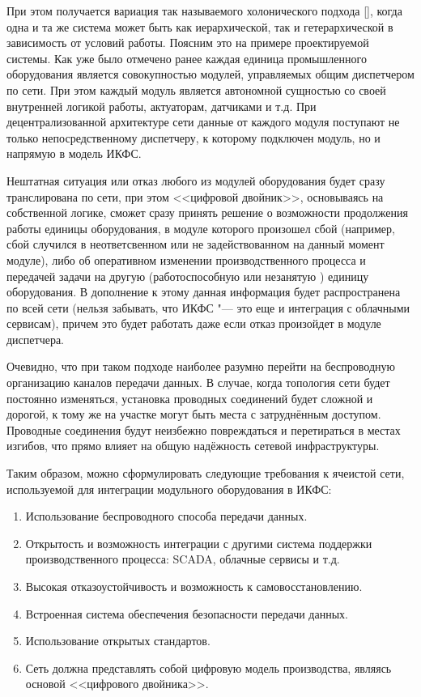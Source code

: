 При этом получается вариация так называемого холонического подхода [], когда одна и та же система может быть как иерархической, так и гетерархической в зависимость от условий работы. Поясним это на примере проектируемой системы. Как уже было отмечено ранее каждая единица промышленного оборудования является совокупностью модулей, управляемых общим диспетчером по сети. При этом каждый модуль является автономной сущностью со своей внутренней логикой работы, актуаторам, датчиками и т.д. При децентрализованной архитектуре сети данные от каждого модуля поступают не только непосредственному диспетчеру, к которому подключен модуль, но и напрямую в модель ИКФС.

Нештатная ситуация или отказ любого из модулей оборудования будет сразу транслирована по сети, при этом <<цифровой двойник>>, основываясь на собственной логике, сможет сразу принять решение о возможности продолжения работы единицы оборудования, в модуле которого произошел сбой (например, сбой случился в неответсвенном или не задействованном на данный момент модуле), либо об оперативном изменении производственного процесса и передачей задачи на другую (работоспособную или незанятую ) единицу оборудования. В дополнение к этому данная информация будет распространена по всей сети (нельзя забывать, что ИКФС "--- это еще и интеграция с облачными сервисам), причем это будет работать даже если отказ произойдет в модуле диспетчера.

Очевидно, что при таком подходе наиболее разумно перейти на беспроводную организацию каналов передачи данных. В случае, когда топология сети будет постоянно изменяться, установка проводных соединений будет сложной и дорогой, к тому же на участке могут быть места с затруднённым доступом. Проводные соединения будут неизбежно повреждаться и перетираться в местах изгибов, что прямо влияет на общую надёжность сетевой инфраструктуры.

Таким образом, можно сформулировать следующие требования к ячеистой сети, используемой для интеграции модульного оборудования в ИКФС:

\begin{enumerate}
	\item Использование беспроводного способа передачи данных.
	\item Открытость и возможность интеграции с другими система поддержки производственного процесса: SCADA, облачные сервисы и т.\:д.
	\item Высокая отказоустойчивость и возможность к самовосстановлению.
	\item Встроенная система обеспечения безопасности передачи данных.
	\item Использование открытых стандартов.
	\item Сеть должна представлять собой цифровую модель производства, являясь основой <<цифрового двойника>>.
\end{enumerate}


